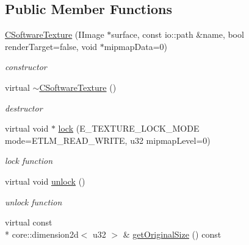 \subsection*{Public Member Functions}
\begin{DoxyCompactItemize}
\item 
\hypertarget{classirr_1_1video_1_1_c_software_texture_ac633eadf4c0ce4aea8ae67bcab12b81c}{\hyperlink{classirr_1_1video_1_1_c_software_texture_ac633eadf4c0ce4aea8ae67bcab12b81c}{C\-Software\-Texture} (I\-Image $\ast$surface, const io\-::path \&name, bool render\-Target=false, void $\ast$mipmap\-Data=0)}\label{classirr_1_1video_1_1_c_software_texture_ac633eadf4c0ce4aea8ae67bcab12b81c}

\begin{DoxyCompactList}\small\item\em constructor \end{DoxyCompactList}\item 
\hypertarget{classirr_1_1video_1_1_c_software_texture_acc0b3b9ada847ac15734766c9446cb59}{virtual \hyperlink{classirr_1_1video_1_1_c_software_texture_acc0b3b9ada847ac15734766c9446cb59}{$\sim$\-C\-Software\-Texture} ()}\label{classirr_1_1video_1_1_c_software_texture_acc0b3b9ada847ac15734766c9446cb59}

\begin{DoxyCompactList}\small\item\em destructor \end{DoxyCompactList}\item 
\hypertarget{classirr_1_1video_1_1_c_software_texture_a6f41443e408e0566459360b0bd8969a3}{virtual void $\ast$ \hyperlink{classirr_1_1video_1_1_c_software_texture_a6f41443e408e0566459360b0bd8969a3}{lock} (E\-\_\-\-T\-E\-X\-T\-U\-R\-E\-\_\-\-L\-O\-C\-K\-\_\-\-M\-O\-D\-E mode=E\-T\-L\-M\-\_\-\-R\-E\-A\-D\-\_\-\-W\-R\-I\-T\-E, u32 mipmap\-Level=0)}\label{classirr_1_1video_1_1_c_software_texture_a6f41443e408e0566459360b0bd8969a3}

\begin{DoxyCompactList}\small\item\em lock function \end{DoxyCompactList}\item 
\hypertarget{classirr_1_1video_1_1_c_software_texture_ae27f846ea0d2caf74dc53f095203b3c2}{virtual void \hyperlink{classirr_1_1video_1_1_c_software_texture_ae27f846ea0d2caf74dc53f095203b3c2}{unlock} ()}\label{classirr_1_1video_1_1_c_software_texture_ae27f846ea0d2caf74dc53f095203b3c2}

\begin{DoxyCompactList}\small\item\em unlock function \end{DoxyCompactList}\item 
\hypertarget{classirr_1_1video_1_1_c_software_texture_af8ce1e92816700a82a25c2173800b518}{virtual const \\*
core\-::dimension2d$<$ u32 $>$ \& \hyperlink{classirr_1_1video_1_1_c_software_texture_af8ce1e92816700a82a25c2173800b518}{get\-Original\-Size} () const }\label{classirr_1_1video_1_1_c_software_texture_af8ce1e92816700a82a25c2173800b518}


\end{DoxyCompactItemize}
